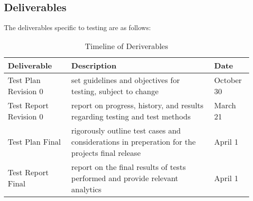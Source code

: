 \documentclass[12pt]{article}
\begin{document}
\subsection{Deliverables} %
The deliverables specific to testing are as follows:
\begin{centering}
\begin{longtable}{>{\raggedright\arraybackslash}p{}>{\raggedright\arraybackslash}p{}>{\raggedright\arraybackslash}p{}}
\caption{Timeline of Deriverables}\\
\bf Deliverable & \bf Description & \bf Date\\\hline
Test Plan Revision 0 & set guidelines and objectives for testing, subject to change & October 30\\\hline
Test Report Revision 0 & report on progress, history, and results regarding testing and test methods & March 21\\\hline
Test Plan Final & rigorously outline test cases and considerations in preperation for the projects final release & April 1\\\hline
Test Report Final & report on the final results of tests performed and provide relevant analytics & April 1\\\hline
\end{longtable}
\end{centering}
\end{document}
